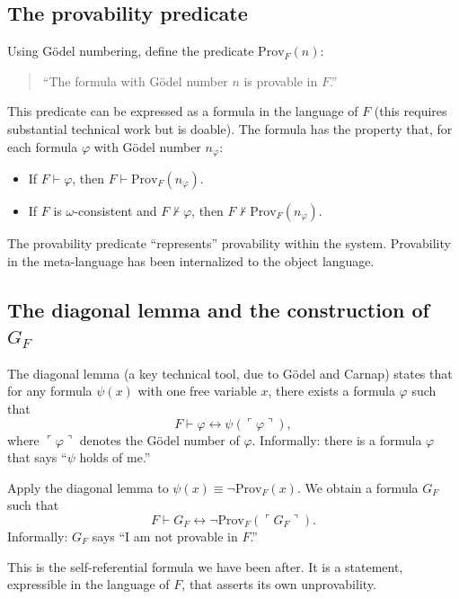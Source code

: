 \subsection{The provability predicate}

Using G\"odel numbering, define the predicate $\text{Prov}_F(n)$:

\begin{quote}
``The formula with G\"odel number $n$ is provable in $F$.''
\end{quote}

This predicate can be expressed as a formula in the language of $F$
(this requires substantial technical work but is doable). The
formula has the property that, for each formula $\varphi$ with
G\"odel number $n_\varphi$:

\begin{itemize}[leftmargin=2em]
    \item If $F \vdash \varphi$, then $F \vdash \text{Prov}_F(n_\varphi)$.
    \item If $F$ is $\omega$-consistent and $F \nvdash \varphi$, then
    $F \nvdash \text{Prov}_F(n_\varphi)$.
\end{itemize}

The provability predicate ``represents'' provability within the
system. Provability in the meta-language has been internalized to
the object language.

\subsection{The diagonal lemma and the construction of $G_F$}

The diagonal lemma (a key technical tool, due to G\"odel and
Carnap) states that for any formula $\psi(x)$ with one free
variable $x$, there exists a formula $\varphi$ such that
\[
    F \vdash \varphi \leftrightarrow \psi(\ulcorner \varphi \urcorner),
\]
where $\ulcorner \varphi \urcorner$ denotes the G\"odel number of
$\varphi$. Informally: there is a formula $\varphi$ that says
``$\psi$ holds of me.''

Apply the diagonal lemma to $\psi(x) \equiv \neg \text{Prov}_F(x)$.
We obtain a formula $G_F$ such that
\[
    F \vdash G_F \leftrightarrow \neg \text{Prov}_F(\ulcorner G_F \urcorner).
\]
Informally: $G_F$ says ``I am not provable in $F$.''

This is the self-referential formula we have been after. It is a
statement, expressible in the language of $F$, that asserts its own
unprovability.

